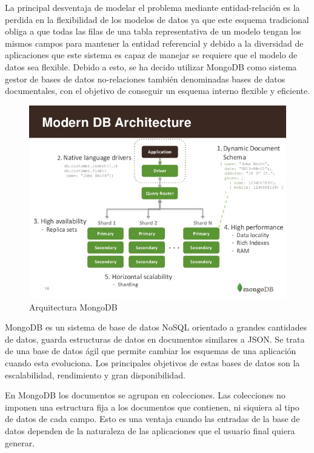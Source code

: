 \documentclass[a4paper,11pt]{book}
\begin{document}
La principal desventaja de modelar el problema mediante entidad-relación es la perdida en la flexibilidad de los modelos de datos ya que este esquema tradicional obliga a que todas las filas de una tabla representativa de un modelo tengan los mismos campos para mantener la entidad referencial y debido a la diversidad de aplicaciones que este sistema es capaz de manejar se requiere que el modelo de datos sea flexible. Debido a esto, se ha decido utilizar MongoDB\cite{mg} como sistema gestor de bases de datos no-relaciones también denominadas bases de datos documentales, con el objetivo de conseguir un esquema interno flexible y eficiente. 

\begin{figure}[H] 
\centering 
\includegraphics[scale=0.30]{imagenes/mongo.jpg}
\caption{ Arquitectura MongoDB\cite{mongoA}  }  
\end{figure} 

MongoDB es un sistema de base de datos NoSQL orientado a grandes cantidades de datos, guarda estructuras de datos en documentos similares a JSON. Se trata de una base de datos ágil que permite cambiar los esquemas de una aplicación cuando esta evoluciona. Los principales objetivos de estas bases de datos son la escalabilidad, rendimiento y gran disponibilidad.

En MongoDB los documentos se agrupan en colecciones. Las colecciones  no imponen una estructura fija a los documentos que contienen, ni siquiera al tipo de datos de cada campo. Esto es una ventaja cuando las entradas de la base de datos dependen de la naturaleza de las aplicaciones que el usuario final quiera generar.  
\end{document}
